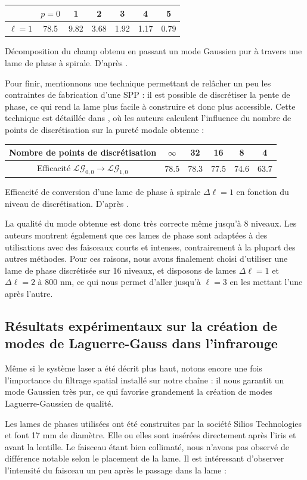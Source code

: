 \begin{center}
  \begin{tabular}{ c | c | c | c | c | c | c }
    \hline
		& $p = 0$ & 1 & 2 & 3 & 4 & 5 \\ \hline
    $\ell=1$ & 78.5 & 9.82 & 3.68 & 1.92 & 1.17 & 0.79 \\ \hline
  \end{tabular}
	\caption{Décomposition du champ obtenu en passant un mode Gaussien pur à travers une lame de phase à spirale. D'après .}
	\label{Tab:DecompBei}
\end{center}
Pour finir, mentionnons une technique permettant de relâcher un peu les contraintes de fabrication d'une SPP : il est possible de discrétiser la pente de phase, ce qui rend la lame plus facile à construire et donc plus accessible. Cette technique est détaillée dans , où les auteurs calculent l'influence du nombre de points de discrétisation sur la pureté modale obtenue :
\begin{center}
  \begin{tabular}{c | c | c | c | c | c}
    \hline
		Nombre de points de discrétisation & $\infty$ & 32 & 16 & 8 & 4 \\ \hline
    Efficacité $\mathcal{LG}_{0,0}\rightarrow\mathcal{LG}_{1,0}$ & 78.5 & 78.3 & 77.5 & 74.6 & 63.7 \\ \hline
  \end{tabular}
	\caption{Efficacité de conversion d'une lame de phase à spirale $\Delta\ell=1$ en fonction du niveau de discrétisation. D'après .}
	\label{Tab:DecompSueda}
\end{center}
La qualité du mode obtenue est donc très correcte même jusqu'à 8 niveaux. Les auteurs montrent également que ces lames de phase sont adaptées à des utilisations avec des faisceaux courts et intenses, contrairement à la plupart des autres méthodes. Pour ces raisons, nous avons finalement choisi d'utiliser une lame de phase discrétisée sur 16 niveaux, et disposons de lames $\Delta\ell = 1$ et $\Delta\ell = 2$ à 800 nm, ce qui nous permet d'aller jusqu’à $\ell = 3$ en les mettant l'une après l'autre.

\subsection{Résultats expérimentaux sur la création de modes de Laguerre-Gauss dans l'infrarouge}
\label{sec:spp}
Même si le système laser a été décrit plus haut, notons encore une fois l'importance du filtrage spatial installé sur notre chaîne : il nous garantit un mode Gaussien très pur, ce qui favorise grandement la création de modes Laguerre-Gaussien de qualité. \par
Les lames de phases utilisées ont été construites par la société Silios Technologies et font 17 mm de diamètre. Elle ou elles sont insérées directement après l'iris et avant la lentille. Le faisceau étant bien collimaté, nous n'avons pas observé de différence notable selon le placement de la lame. Il est intéressant d'observer l'intensité du faisceau un peu après le passage dans la lame : 

